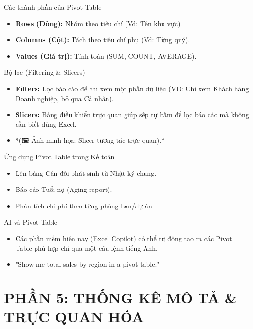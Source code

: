\documentclass[aspectratio=169]{beamer}
\begin{document}
\begin{frame}{Các thành phần của Pivot Table}
    \begin{itemize}
        \item \textbf{Rows (Dòng):} Nhóm theo tiêu chí (Vd: Tên khu vực).
        \item \textbf{Columns (Cột):} Tách theo tiêu chí phụ (Vd: Từng quý).
        \item \textbf{Values (Giá trị):} Tính toán (SUM, COUNT, AVERAGE).
    \end{itemize}
\end{frame}


\begin{frame}{Bộ lọc (Filtering \& Slicers)}
    \begin{itemize}
        \item \textbf{Filters:} Lọc báo cáo để chỉ xem một phần dữ liệu (VD: Chỉ xem Khách hàng Doanh nghiệp, bỏ qua Cá nhân).
        \item \textbf{Slicers:} Bảng điều khiển trực quan giúp sếp tự bấm để lọc báo cáo mà không cần biết dùng Excel.
        \item *(🖼️ Ảnh minh họa: Slicer tương tác trực quan).*
    \end{itemize}
\end{frame}


\begin{frame}{Ứng dụng Pivot Table trong Kế toán}
    \begin{itemize}
        \item Lên bảng Cân đối phát sinh từ Nhật ký chung.
        \item Báo cáo Tuổi nợ (Aging report).
        \item Phân tích chi phí theo từng phòng ban/dự án.
    \end{itemize}
\end{frame}


\begin{frame}{AI và Pivot Table}
    \begin{itemize}
        \item Các phần mềm hiện nay (Excel Copilot) có thể tự động tạo ra các Pivot Table phù hợp chỉ qua một câu lệnh tiếng Anh.
        \item "Show me total sales by region in a pivot table."
    \end{itemize}
\end{frame}


\section{PHẦN 5: THỐNG KÊ MÔ TẢ \& TRỰC QUAN HÓA}
\end{document}
